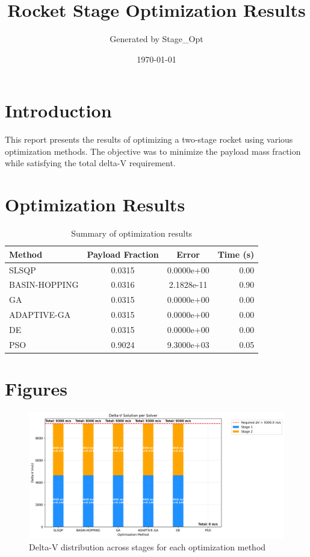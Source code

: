 \documentclass{article}
\title{Rocket Stage Optimization Results}
\author{Generated by Stage\_Opt}
\date{\today}
\begin{document}
\maketitle

\section{Introduction}
This report presents the results of optimizing a two-stage rocket using various optimization methods. The objective was to minimize the payload mass fraction while satisfying the total delta-V requirement.

\section{Optimization Results}
\begin{table}[H]
\centering
\begin{tabular}{lccr}
\toprule
Method & Payload Fraction & Error & Time (s) \\
\midrule
SLSQP & 0.0315 & 0.0000e+00 & 0.00 \\
BASIN-HOPPING & 0.0316 & 2.1828e-11 & 0.90 \\
GA & 0.0315 & 0.0000e+00 & 0.00 \\
ADAPTIVE-GA & 0.0315 & 0.0000e+00 & 0.00 \\
DE & 0.0315 & 0.0000e+00 & 0.00 \\
PSO & 0.9024 & 9.3000e+03 & 0.05 \\
\bottomrule
\end{tabular}
\caption{Summary of optimization results}
\label{tab:results}
\end{table}

\section{Figures}
\begin{figure}[H]
\centering
\includegraphics[width=\textwidth]{dv_breakdown.png}
\caption{Delta-V distribution across stages for each optimization method}
\label{fig:dv-breakdown}
\end{figure}
\end{document}

